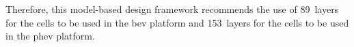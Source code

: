 Therefore, this model-based design framework recommends the use of 89~layers for
the cells to be  used in the \gls{bev} platform and 153~layers  for the cells to
be used in the \gls{phev} platform.


